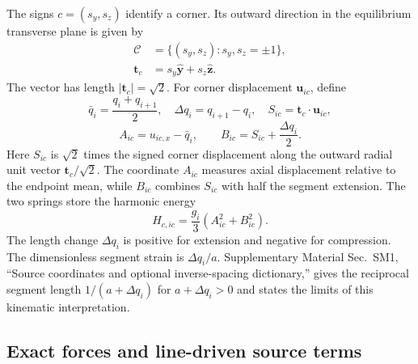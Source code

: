 \documentclass[10pt,aps,onecolumn,floatfix,notitlepage,nofootinbib,showkeys]{revtex4-2}
\newcommand{\vu}{\bm{u}}
\newcommand{\vt}{\bm{t}}
\newcommand{\ey}{\hat{\bm{y}}}
\newcommand{\ez}{\hat{\bm{z}}}
\newcommand{\Cc}{\mathcal C}
\begin{document}
The signs $c=(s_y,s_z)$ identify a corner. Its outward direction in the equilibrium transverse plane is given by
\begin{align}
  \Cc&=\{(s_y,s_z):s_y,s_z=\pm1\},\\
  \vt_c&=s_y\ey+s_z\ez.
  \label{eq:s3-corners}
\end{align}
The vector has length $|\vt_c|=\sqrt2$. For corner displacement $\vu_{ic}$, define
\begin{equation}
  \bar q_i=\frac{q_i+q_{i+1}}{2},
  \quad
  \Delta q_i=q_{i+1}-q_i,
  \quad
  S_{ic}=\vt_c\!\cdot\vu_{ic},
  \label{eq:s3-kinematic-defs}
\end{equation}
\begin{equation}
  A_{ic}=u_{ic,x}-\bar q_i,
  \qquad
  B_{ic}=S_{ic}+\frac{\Delta q_i}{2}.
  \label{eq:s3-AB}
\end{equation}
Here $S_{ic}$ is $\sqrt2$ times the signed corner displacement along the outward radial unit vector $\vt_c/\sqrt2$. The coordinate $A_{ic}$ measures axial displacement relative to the endpoint mean, while $B_{ic}$ combines $S_{ic}$ with half the segment extension. The two springs store the harmonic energy
\begin{equation}
  H_{c,ic}=\frac{g_i}{3}\left(A_{ic}^{2}+B_{ic}^{2}\right).
  \label{eq:s3-Hcorner}
\end{equation}
The length change $\Delta q_i$ is positive for extension and negative for compression. The dimensionless segment strain is $\Delta q_i/a$. Supplementary Material Sec.~SM1, ``Source coordinates and optional inverse-spacing dictionary,'' gives the reciprocal segment length $1/(a+\Delta q_i)$ for $a+\Delta q_i>0$ and states the limits of this kinematic interpretation.

\subsection{Exact forces and line-driven source terms}
\label{sec:s3-forces}
\end{document}
